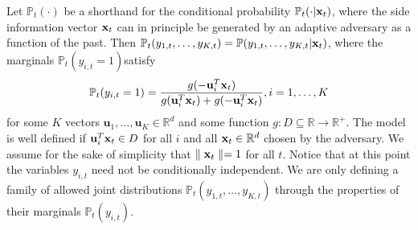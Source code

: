\iffalse
For any subset $Y_t\subseteq[K]$, we let $(y_{1,t},\dots,y_{K,t})\in \{0,1\}^K$ be the corresponding indicator vector. Then it is easy to see that $\loss_{a,c}(Y_t,\hY) = a\sum_{i=1}^{K} y_{i,t} + (1-a)\sum_{i\in \hY}-(\frac{a}{1-a}+c(j_i,|\hY|)y_{i,t})$. Moreover, because the first sum does not depend on $\hY$, for the sake of optimizing over $\hY$ we can equivalently define
\begin{equation}
\label{equa:gentileML1}
\loss_{a,c}(Y_t,\hY) = (1-a)\underset{i\in\hY}{\sum}\left(c(j_i,|\hY|)-(\frac{a}{1-a}+c(j_i,|\hY|))y_{i,t}\right)
\end{equation}
\fi
Let $\mathbb{P}_t(\cdot)$ be a shorthand for the conditional probability $\mathbb{P}_t(\cdot|\mathbf{x}_t)$, where the side information vector $\mathbf{x}_t$ can in principle be generated by an adaptive adversary as a function of the past. Then $\mathbb{P}_t(y_{1,t},\dots,y_{K,t}) = \mathbb{P}(y_{1,t},\dots,y_{K,t}|\mathbf{x}_t)$, where the marginals $\mathbb{P}_t(y_{i,t}=1)$satisfy 
\begin{equation}
\label{equa:gentileML2}
\mathbb{P}_t(y_{i,t} = 1) = \frac{g(-\mathbf{u}_i^T\mathbf{x}_t)}{g(\mathbf{u}_i^T\mathbf{x}_t)+g(-\mathbf{u}_i^T\mathbf{x}_t)}, i=1,\dots,K
\end{equation}
for some $K$ vectors $\mathbf{u}_1,\dots,\mathbf{u}_K\in\mathbb{R}^d$ and some function $g: D\subseteq \mathbb{R}\rightarrow \mathbb{R}^+$. The model is well defined if $\mathbf{u}_i^T\mathbf{x}_t \in D$ for all $i$ and all $\mathbf{x}_t\in\mathbb{R}^d$ chosen by the adversary. We assume for the sake of simplicity that $\parallel{\mathbf{x}_t}\parallel = 1$ for all $t$. Notice that at this point the variables $y_{i,t}$ need not be conditionally independent. We are only defining a family of allowed joint distributions $\mathbb{P}_t(y_{1,t},\dots,y_{K,t})$ through the properties of their marginals $\mathbb{P}_t(y_{i,t})$. 

